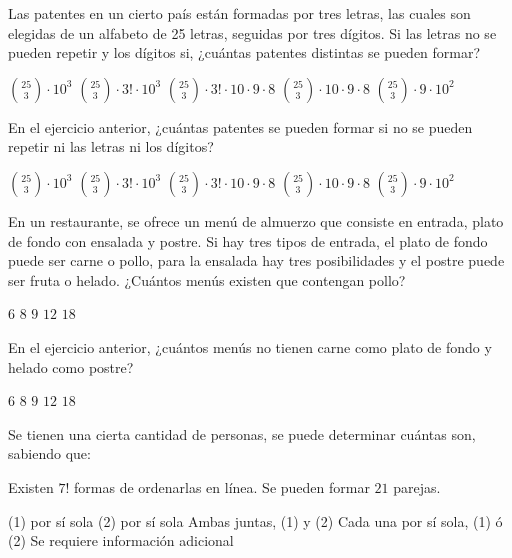 \documentclass[sin nombre]{srs}
\begin{document}
\begin{preguntas}[after-item-skip=2cm]
\pregunta Las patentes en un cierto país están formadas por tres letras, las cuales son elegidas de un alfabeto de 25 letras, seguidas por tres dígitos. Si las letras no se pueden repetir y los dígitos si, ¿cuántas patentes distintas se pueden formar?
\begin{vertical}
\alternativa $\binom{25}{3} \cdot 10^3$
\alternativa $\binom{25}{3} \cdot 3! \cdot 10^3$
\alternativa $\binom{25}{3} \cdot 3! \cdot 10 \cdot 9 \cdot 8$
\alternativa $\binom{25}{3} \cdot 10 \cdot 9 \cdot 8$
\alternativa $\binom{25}{3} \cdot 9 \cdot 10^2$
\end{vertical}

\pregunta En el ejercicio anterior, ¿cuántas patentes se pueden formar si no se pueden repetir ni las letras ni los dígitos?
\begin{vertical}
\alternativa $\binom{25}{3} \cdot 10^3$
\alternativa $\binom{25}{3} \cdot 3! \cdot 10^3$
\alternativa $\binom{25}{3} \cdot 3! \cdot 10 \cdot 9 \cdot 8$
\alternativa $\binom{25}{3} \cdot 10 \cdot 9 \cdot 8$
\alternativa $\binom{25}{3} \cdot 9 \cdot 10^2$
\end{vertical}

\pregunta En un restaurante, se ofrece un menú de almuerzo que consiste en entrada, plato de fondo con ensalada y postre. Si hay tres tipos de entrada, el plato de fondo puede ser carne o pollo, para la ensalada hay tres posibilidades y el postre puede ser fruta o helado. ¿Cuántos menús existen que contengan pollo?
\begin{vertical}
\alternativa $6$
\alternativa $8$
\alternativa $9$
\alternativa $12$
\alternativa $18$
\end{vertical}

\pregunta En el ejercicio anterior, ¿cuántos menús no tienen carne como plato de fondo y helado como postre?
\begin{vertical}
\alternativa $6$
\alternativa $8$
\alternativa $9$
\alternativa $12$
\alternativa $18$
\end{vertical}

\pregunta Se tienen una cierta cantidad de personas, se puede determinar cuántas son, sabiendo que:
\begin{verticaln}
\alternativa Existen $7!$ formas de ordenarlas en línea.
\alternativa Se pueden formar $21$ parejas.
\end{verticaln}
\begin{vertical}
\alternativa (1) por sí sola
\alternativa (2) por sí sola
\alternativa Ambas juntas, (1) y (2)
\alternativa Cada una por sí sola, (1) ó (2)
\alternativa Se requiere información adicional
\end{vertical}


\end{preguntas}
\end{document}
